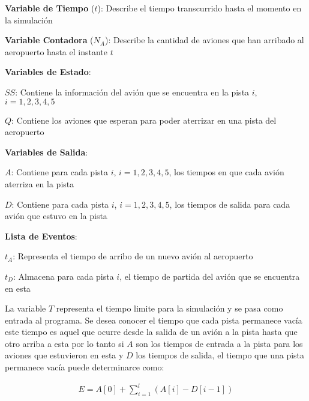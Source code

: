 \documentclass[a4paper,10pt,twocolumn]{article}
\begin{document}
	\begin{description}
		\item \textbf{Variable de Tiempo} ($t$): Describe el tiempo transcurrido hasta el momento en la simulaci\'on
		\item \textbf{Variable Contadora} ($N_{A}$): Describe la cantidad de aviones que han arribado al aeropuerto hasta el instante $t$
		\item \textbf{Variables de Estado}:
		\begin{description}
			\item $SS$: Contiene la informaci\'on del avi\'on que se encuentra en la pista $i$, $i = 1,2,3,4,5$
			\item $Q$: Contiene los aviones que esperan para poder aterrizar en una pista del aeropuerto 	
		\end{description}
		\item \textbf{Variables de Salida}:
		\begin{description}
			\item $A$: Contiene para cada pista $i$, $i = 1,2,3,4,5$, los tiempos en que cada avi\'on aterriza en la pista
			\item $D$: Contiene para cada pista $i$, $i = 1,2,3,4,5$, los tiempos de salida para cada avi\'on que estuvo en la pista 	
		\end{description}
		\item \textbf{Lista de Eventos}:
		\begin{description}
			\item $t_{A}$: Representa el tiempo de arribo de un nuevo avi\'on al aeropuerto
			\item $t_{D}$: Almacena para cada pista $i$, el tiempo de partida del avi\'on que se encuentra en esta
		\end{description}
	\end{description}
	
	La variable $T$ representa el tiempo limite para la simulaci\'on y se pasa como entrada al programa.
	Se desea conocer el tiempo que cada pista permanece vac\'ia este tiempo es aquel que ocurre desde la salida de
	un avi\'on a la pista hasta que otro arriba a esta por lo tanto si $A$ son los tiempos de entrada a la pista
	para los aviones que estuvieron en esta y $D$ los tiempos de salida, el tiempo que una pista permanece vac\'ia
	puede determinarce como:

	\begin{align*}
		E = A[0] + \sum_{i=1}^{l}(A[i] - D[i-1])  
	\end{align*}
\end{document}
